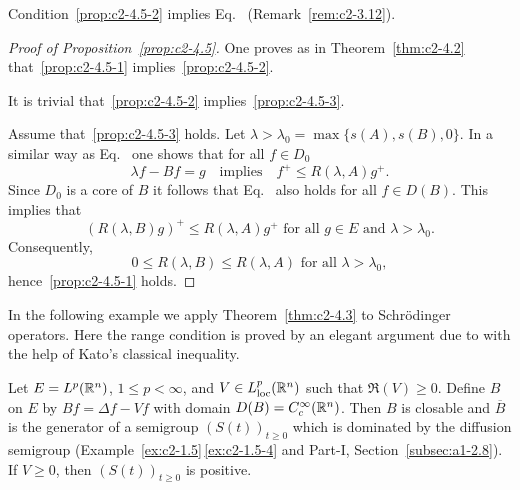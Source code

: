 \begin{remark}\label{rem:c2-4.6}
Condition~\ref{prop:c2-4.5-2}   implies Eq.~ (\cf Remark~\ref{rem:c2-3.12}).
\end{remark}
\begin{proof}[Proof of Proposition~\ref{prop:c2-4.5}]
One proves as in Theorem~\ref{thm:c2-4.2}   that~\ref{prop:c2-4.5-1} implies~\ref{prop:c2-4.5-2}.

It is trivial that~\ref{prop:c2-4.5-2}   implies~\ref{prop:c2-4.5-3}. 

Assume that~\ref{prop:c2-4.5-3}   holds. 
Let $\lambda > \lambda_{0} = \max \{s(A),s(B),0\}$. 
In a similar way as Eq.~ one shows that for all $f \in D_{0}$
\begin{equation}\label{eq:c2-4.10}
\lambda f - Bf = g \quad\text{implies}\quad f^{+} \leq R(\lambda,A)g^{+}.
\end{equation}
Since $D_{0}$ is a core of\/ $B$ it follows that Eq.~ also holds for all $f \in D(B)$. 
This implies that 
\[
(R(\lambda,B)g)^{+} \leq R(\lambda,A)g^{+} \text{ for all } g \in E \text{ and } \lambda > \lambda_{0} .
\]
Consequently, 
\[
0 \leq R(\lambda,B) \leq R(\lambda,A) \text{ for all } \lambda > \lambda_{0} ,
\]
hence~\ref{prop:c2-4.5-1}   holds.
\end{proof}
In the following example we apply Theorem~\ref{thm:c2-4.3} to Schrödinger operators. 
Here the range condition is proved by an elegant argument due to \textcite{kato:1986} with the help of Kato's classical inequality.
\begin{example}
\label{ex:c2-4.7}
Let $E = L^{p}(\mathbb{R}^{n})$, $1 \leq p < \infty$, and $V \in L^{p}_{\text{loc}}(\mathbb{R}^{n})$ such that $\Re(V) \geq 0$.
Define $B$ on $E$ by $Bf = \Delta f - Vf$ with domain $D(B) = C^{\infty}_{c}(\mathbb{R}^{n})$. 
Then $B$ is closable and $\overline{B}$ is the generator of a semigroup $(S(t))_{t \geq 0}$ which is dominated by the diffusion semigroup (Example~\ref{ex:c2-1.5}\,\ref{ex:c2-1.5-4} and Part-I, Section~\ref{subsec:a1-2.8}). 
If\/ $V \geq 0$, then $(S(t))_{t \geq 0}$ is positive.
\end{example}

